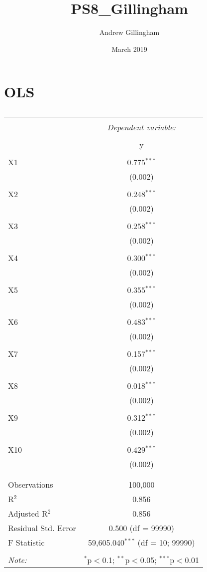 \documentclass{article}
\title{PS8_Gillingham}
\author{Andrew Gillingham }
\date{March 2019}
\begin{document}
\section{OLS}


\begin{table}[!htbp] \centering 
  \caption{} 
  \label{} 
\begin{tabular}{@{\extracolsep{5pt}}lc} 
\\[-1.8ex]\hline 
\hline \\[-1.8ex] 
 & \multicolumn{1}{c}{\textit{Dependent variable:}} \\ 
\cline{2-2} 
\\[-1.8ex] & y \\ 
\hline \\[-1.8ex] 
 X1 & 0.775$^{***}$ \\ 
  & (0.002) \\ 
  & \\ 
 X2 & 0.248$^{***}$ \\ 
  & (0.002) \\ 
  & \\ 
 X3 & 0.258$^{***}$ \\ 
  & (0.002) \\ 
  & \\ 
 X4 & 0.300$^{***}$ \\ 
  & (0.002) \\ 
  & \\ 
 X5 & 0.355$^{***}$ \\ 
  & (0.002) \\ 
  & \\ 
 X6 & 0.483$^{***}$ \\ 
  & (0.002) \\ 
  & \\ 
 X7 & 0.157$^{***}$ \\ 
  & (0.002) \\ 
  & \\ 
 X8 & 0.018$^{***}$ \\ 
  & (0.002) \\ 
  & \\ 
 X9 & 0.312$^{***}$ \\ 
  & (0.002) \\ 
  & \\ 
 X10 & 0.429$^{***}$ \\ 
  & (0.002) \\ 
  & \\ 
\hline \\[-1.8ex] 
Observations & 100,000 \\ 
R$^{2}$ & 0.856 \\ 
Adjusted R$^{2}$ & 0.856 \\ 
Residual Std. Error & 0.500 (df = 99990) \\ 
F Statistic & 59,605.040$^{***}$ (df = 10; 99990) \\ 
\hline 
\hline \\[-1.8ex] 
\textit{Note:}  & \multicolumn{1}{r}{$^{*}$p$<$0.1; $^{**}$p$<$0.05; $^{***}$p$<$0.01} \\ 
\end{tabular} 
\end{table} 
\end{document}
